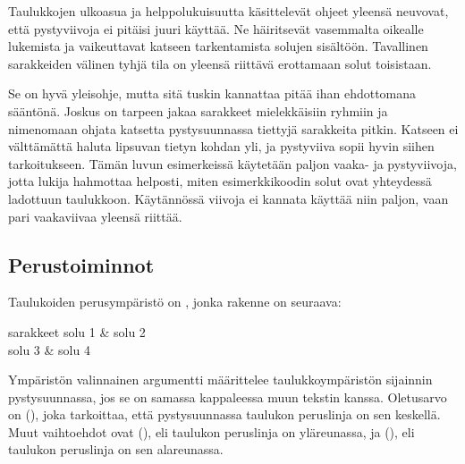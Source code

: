 Taulukkojen ulkoasua ja helppolukuisuutta käsittelevät ohjeet yleensä
neuvovat, että pystyviivoja ei pitäisi juuri käyttää. Ne häiritsevät
vasemmalta oikealle lukemista ja vaikeuttavat katseen tarkentamista
solujen sisältöön. Tavallinen sarakkeiden välinen tyhjä tila on yleensä
riittävä erottamaan solut toisistaan.

Se on hyvä yleisohje, mutta sitä tuskin kannattaa pitää ihan ehdottomana
sääntönä. Joskus on tarpeen jakaa sarakkeet mielekkäisiin ryhmiin ja
nimenomaan ohjata katsetta pystysuunnassa tiettyjä sarakkeita pitkin.
Katseen ei välttämättä haluta lipsuvan tietyn kohdan yli, ja pystyviiva
sopii hyvin siihen tarkoitukseen. Tämän luvun esimerkeissä käytetään
paljon vaaka- ja pystyviivoja, jotta lukija hahmottaa helposti, miten
esimerkkikoodin solut ovat yhteydessä ladottuun taulukkoon. Käytännössä
viivoja ei kannata käyttää niin paljon, vaan pari vaakaviivaa yleensä
riittää.

\subsection{Perustoiminnot}

Taulukoiden perusympäristö on , jonka rakenne on
seuraava:

\komentoi{\keno}
\begin{koodilohkosis}
\begin{tabular}[sijainti]{sarakkeet}
  solu 1 & solu 2 \\
  solu 3 & solu 4 \\
\end{tabular}
\end{koodilohkosis}

\noindent
Ympäristön valinnainen argumentti  määrittelee
taulukkoympäristön sijainnin pystysuunnassa, jos se on samassa
kappaleessa muun tekstin kanssa. Oletusarvo on 
(), joka tarkoittaa, että pystysuunnassa taulukon
peruslinja on sen keskellä. Muut vaihtoehdot ovat 
(), eli taulukon peruslinja on yläreunassa, ja 
(), eli taulukon peruslinja on sen alareunassa.


